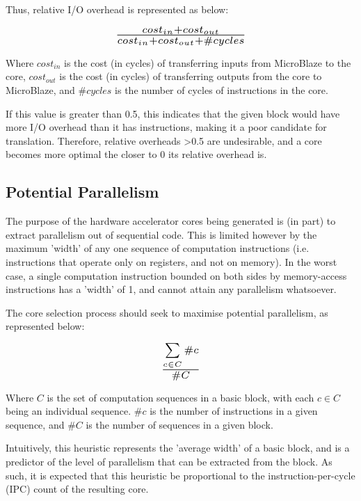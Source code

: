 \documentclass{UoYCSproject}
\begin{document}
Thus, relative I/O overhead is represented as below:

\begin{equation}
\scalebox{1.5}{$\frac{cost_{in} + cost_{out}}{cost_{in} + cost_{out} + \#cycles}$}
\end{equation}

Where \(cost_{in}\) is the cost (in cycles) of transferring inputs from MicroBlaze to the core, \(cost_{out}\) is the cost
(in cycles) of transferring outputs from the core to MicroBlaze, and \(\#cycles\) is the number of cycles of instructions in the
core.

If this value is greater than 0.5, this indicates that the given block would have more I/O overhead than it has instructions,
making it a poor candidate for translation. Therefore, relative overheads >0.5 are undesirable, and a core becomes more optimal
the closer to 0 its relative overhead is.

\subsection{Potential Parallelism}

The purpose of the hardware accelerator cores being generated is (in part) to extract parallelism out of sequential code.
This is limited however by the maximum 'width' of any one sequence of computation instructions (i.e. instructions that operate
only on registers, and not on memory). In the worst case, a single computation instruction bounded on both sides by memory-access
instructions has a 'width' of 1, and cannot attain any parallelism whatsoever.

The core selection process should seek to maximise potential parallelism, as represented below:

\begin{equation}
\scalebox{1.5}{$\frac{\sum\limits_{c \in C} \#c}{\#C}$}
\end{equation}

Where \(C\) is the set of computation sequences in a basic block, with each \(c \in C\) being an individual sequence.
\(\#c\) is the number of instructions in a given sequence, and \(\#C\) is the number of sequences in a given block.

Intuitively, this heuristic represents the 'average width' of a basic block, and is a predictor of the level of parallelism that
can be extracted from the block. As such, it is expected that this heuristic be proportional to the instruction-per-cycle (IPC)
count of the resulting core.
\end{document}
